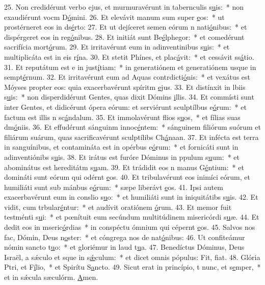 25. Non credidérunt verbo ejus, et murmuravérunt in tabernculis s\uline{u}is:~* non exaudiérunt vocm D\uline{ó}mini.
26. Et elevávit manum sum super \uline{e}os:~* ut prostérneret eos in ds\uline{é}rto:
27. Et ut dejíceret semen eórum n nati\uline{ó}nibus:~* et dispérgeret eos in reg\uline{ó}nibus.
28. Et initiát sunt Be\uline{é}lphegor:~* et comedérunt sacrifícia mort\uline{ó}rum.
29. Et irritavérunt eum in adinventinibus s\uline{u}is:~* et multiplicáta est in eis r\uline{í}na.
30. Et stetit Phínes, et plac\uline{á}vit:~* et cessávit ss\uline{á}tio.
31. Et reputátum est e in just\uline{í}tiam:~* in generatiónem et generatiónem usque in sempt\uline{é}rnum.
32. Et irritavérunt eum ad Aquas contrdicti\uline{ó}nis:~* et vexátus est Móyses propter eos: quia exacerbavérunt spíritm \uline{e}jus.
33. Et distínxit in lbiis s\uline{u}is:~* non disperdidérunt Gentes, quas dixit Dómins \uline{i}llis.
34. Et commísti sunt inter Gentes, et didicérunt ópera eórum: et serviérunt sculptílbus e\uline{ó}rum:~* et factum est illis n sc\uline{á}ndalum.
35. Et immolavérunt flios s\uline{u}os,~* et fílias suas dm\uline{ó}niis.
36. Et effudérunt sánguinm innoc\uline{é}ntem:~* sánguinem filiórum suórum et filiárum suárum, quas sacrificavérunt sculptílibs Ch\uline{á}naan.
37. Et infécta est terra in sanguínibus, et contamináta est in opérbus e\uline{ó}rum:~* et fornicáti sunt in adinventiónibs s\uline{u}is.
38. Et irátus est furóre Dóminus in ppulum s\uline{u}um:~* et abominátus est hereditátm s\uline{u}am.
39. Et trádidit eos n manus G\uline{é}ntium:~* et domináti sunt eórum qui odérnt \uline{e}os.
40. Et tribulavérunt eos inimíci eórum, et humiliáti sunt sub mánbus e\uline{ó}rum:~* sæpe liberávt \uline{e}os.
41. Ipsi autem exacerbavérunt eum in conslio s\uline{u}o:~* et humiliáti sunt in iniquitátibs s\uline{u}is.
42. Et vidit, cum trbular\uline{é}ntur:~* et audívit oratiónem \uline{ó}rum.
43. Et memor fuit testménti s\uline{u}i:~* et pœnítuit eum secúndum multitúdinem misericórdi s\uline{u}æ.
44. Et dedit eos in mseric\uline{ó}rdias~* in conspéctu ómnium qui cépernt \uline{e}os.
45. Salvos nos fac, Dómin, Deus n\uline{o}ster:~* et cóngrega nos de nat\uline{ó}nibus:
46. Ut confiteámur nómin sancto t\uline{u}o:~* et gloriémur in laud t\uline{u}a.
47. Benedíctus Dóminus, Deus Israël, a sǽculo et sque in s\uline{ǽ}culum:~* et dicet omnis pópulus: Fit, f\uline{i}at.
48. Glória Ptri, et F\uline{í}lio,~* et Spirítu S\uline{a}ncto.
49. Sicut erat in princípio, t nunc, et s\uline{e}mper,~* et in sǽcula sæculórm. \uline{A}men.
